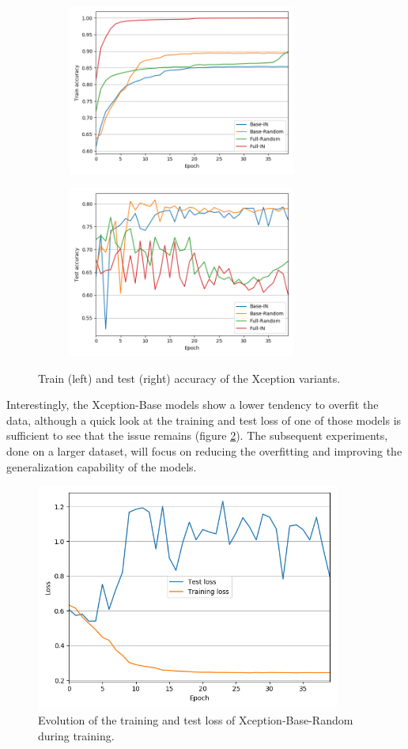 \documentclass[11pt]{report}
\begin{document}
\begin{figure}[h!]
\centering
  \begin{subfigure}{8cm}
    \centering\includegraphics[width=7.5cm]{plot_train_acc_xcep.png}
  \end{subfigure}
  \begin{subfigure}{8cm}
    \centering\includegraphics[width=7.5cm]{plot_test_acc_xcep.png}
  \end{subfigure}
\caption{Train (left) and test (right) accuracy of the Xception variants.}
\label{xceptionprelim1}
\end{figure}

Interestingly, the Xception-Base models show a lower tendency to overfit the data, although a quick look at the training and test loss of one of those models is sufficient to see that the issue remains (figure \ref{lossxcepprel}). The subsequent experiments, done on a larger dataset, will focus on reducing the overfitting and improving the generalization capability of the models.

\begin{figure}[H]
\centering\includegraphics[width=10cm]{plot_loss_xcep_base_random.png}
\caption{Evolution of the training and test loss of Xception-Base-Random during training.}
\label{lossxcepprel}
\end{figure}
\end{document}
